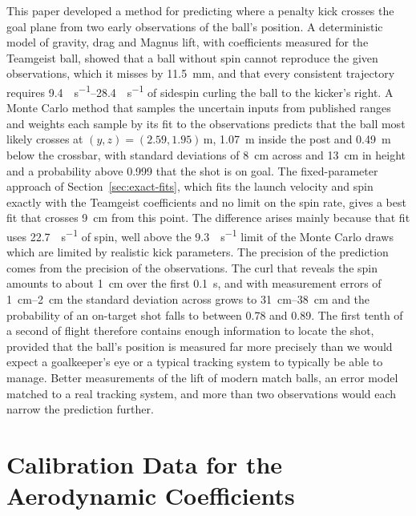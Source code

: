 \documentclass[10pt,a4paper]{article}
\begin{document}
This paper developed a method for predicting where a penalty kick crosses the
goal plane from two early observations of the ball's position. A
deterministic model of gravity, drag and Magnus lift, with coefficients
measured for the Teamgeist ball, showed that a ball without spin cannot
reproduce the given observations, which it misses by \SI{11.5}{\milli\metre},
and that every consistent trajectory requires
\SIrange{9.4}{28.4}{\rev\per\second} of sidespin curling the ball to the
kicker's right. A Monte Carlo method that samples the uncertain inputs from
published ranges and weights each sample by its fit to the observations
predicts that the ball most likely crosses at
$(y, z) = (2.59, 1.95)$\,\si{\metre}, \SI{1.07}{\metre} inside the post and
\SI{0.49}{\metre} below the crossbar, with standard deviations of
\SI{8}{\centi\metre} across and \SI{13}{\centi\metre} in height and a
probability above 0.999 that the shot is on goal. The fixed-parameter
approach of Section~\ref{sec:exact-fits}, which fits the launch velocity and
spin exactly with the Teamgeist coefficients and no limit on the spin rate,
gives a best fit that crosses \SI{9}{\centi\metre} from this point. The
difference arises mainly because that fit uses \SI{22.7}{\rev\per\second} of
spin, well above the \SI{9.3}{\rev\per\second} limit of the Monte Carlo
draws which are limited by realistic kick parameters. The precision of the prediction
comes from the precision of the observations. The curl that reveals the spin
amounts to about \SI{1}{\centi\metre} over the first \SI{0.1}{\second}, and
with measurement errors of \SIrange{1}{2}{\centi\metre} the standard
deviation across grows to \SIrange{31}{38}{\centi\metre} and the probability
of an on-target shot falls to between 0.78 and 0.89. The first tenth of a
second of flight therefore contains enough information to locate the shot,
provided that the ball's position is measured far more precisely than we would expect a
goalkeeper's eye or a typical tracking system to typically be able to manage. Better measurements
of the lift of modern match balls, an error model matched to a real tracking
system, and more than two observations would each narrow the prediction
further.

\appendix
\section{Calibration Data for the Aerodynamic Coefficients}
\label{app:coef-data}
\end{document}
